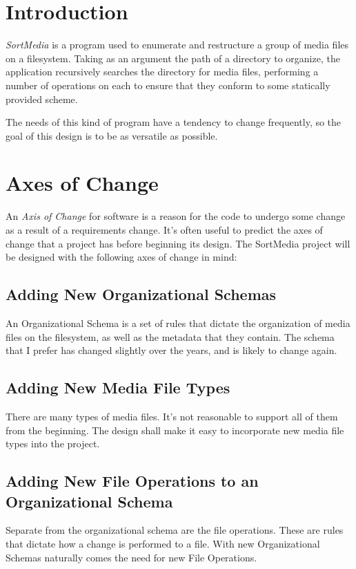 \documentclass{designdoc}
\begin{document}
\section{Introduction}
\textit{SortMedia} is a program used to enumerate and restructure a group of
media files on a filesystem. Taking as an argument the path of a directory to
organize, the application recursively searches the directory for media files,
performing a number of operations on each to ensure that they conform to some
statically provided scheme.

The needs of this kind of program have a tendency to change frequently, so the
goal of this design is to be as versatile as possible.

\hypertarget{sec:axesOfChange}{\section{Axes of Change}}
An \textit{Axis of Change} for software is a reason for the code to undergo
some change as a result of a requirements change. It's often useful to predict
the axes of change that a project has before beginning its design. The
SortMedia project will be designed with the following axes of change in mind:

\subsection{Adding New Organizational Schemas}
An Organizational Schema is a set of rules that dictate the organization of
media files on the filesystem, as well as the metadata that they contain. The
schema that I prefer has changed slightly over the years, and is likely to
change again.

\subsection{Adding New Media File Types}
There are many types of media files. It's not reasonable to support all of them
from the beginning. The design shall make it easy to incorporate new media file
types into the project.

\subsection{Adding New File Operations to an Organizational Schema}
Separate from the organizational schema are the file operations. These are
rules that dictate how a change is performed to a file. With new Organizational
Schemas naturally comes the need for new File Operations.
\end{document}
